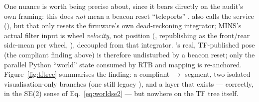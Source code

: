 One nuance is worth being precise about, since it bears directly on the
audit's own framing: this does \emph{not} mean a beacon reset
``teleports'' .  also calls
the  service (), but that only resets the firmware's own dead-reckoning
integrator; MINS's actual filter input is wheel \emph{velocity}, not
position (, republishing 
as the front/rear side-mean per wheel, ), decoupled from that integrator. 's
real, TF-published pose (the compliant finding above) is therefore
undisturbed by a beacon reset; only the parallel Python ``world'' state
consumed by RTB and mapping is re-anchored. Figure~\ref{fig:tftree}
summarises the finding: a compliant $\to$
segment, two isolated visualisation-only branches (one still legacy
), and a  layer that exists — correctly, in the SE(2)
sense of Eq.~\ref{eq:worldse2} — but nowhere on the TF tree itself.

